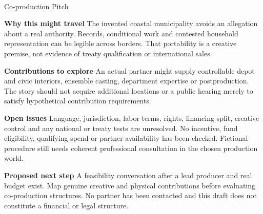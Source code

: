 \documentclass[11pt,letterpaper]{article}
\begin{document}
\begin{center}
{\Large\bfseries\sffamily \filmtitleupper}\\[6pt]
Co-production Pitch
\end{center}
\textbf{Why this might travel} The invented coastal municipality avoids an allegation about a real authority. Records, conditional work and contested household representation can be legible across borders. That portability is a creative premise, not evidence of treaty qualification or international sales.

\textbf{Contributions to explore} An actual partner might supply controllable depot and civic interiors, ensemble casting, department expertise or postproduction. The story should not acquire additional locations or a public hearing merely to satisfy hypothetical contribution requirements.

\textbf{Open issues} Language, jurisdiction, labor terms, rights, financing split, creative control and any national or treaty tests are unresolved. No incentive, fund eligibility, qualifying spend or partner availability has been checked. Fictional procedure still needs coherent professional consultation in the chosen production world.

\textbf{Proposed next step} A feasibility conversation after a lead producer and real budget exist. Map genuine creative and physical contributions before evaluating co-production structures. No partner has been contacted and this draft does not constitute a financial or legal structure.
\end{document}

